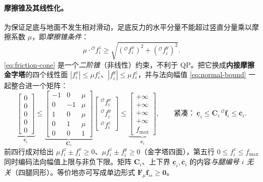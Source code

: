 \paragraph{ 摩擦锥及其线性化。}
为保证足底与地面不发生相对滑动，足底反力的水平分量不能超过竖直分量乘以摩擦系数 $\mu$，即\emph{摩擦锥条件}\cite{dicarlo2018cheetah,yu2021quadruped}：
\begin{equation}
  \mu\cdot{}^{\mathcal{O}}f_i^{z}\ge\sqrt{({}^{\mathcal{O}}f_i^{x})^2+({}^{\mathcal{O}}f_i^{y})^2}.
  \label{eq:friction-cone}
\end{equation}
\cref{eq:friction-cone} 是一个\emph{二阶锥}（非线性）约束，不利于 QP。把它换成\textbf{内接摩擦金字塔}的四个线性面 $|f_i^x|\le\mu f_i^z$、$|f_i^y|\le\mu f_i^z$，并与法向幅值 \cref{eq:normal-bound} 一起整合进一个矩阵\cite{dicarlo2018cheetah,yu2021quadruped}：
\begin{equation}
  \underbrace{\begin{bmatrix} 0 \\ 0 \\ 0 \\ 0 \\ 0 \end{bmatrix}}_{\underline{\mathbf{c}}_i}
  \le
  \underbrace{\begin{bmatrix} -1 & 0 & \mu \\ 0 & -1 & \mu \\ 1 & 0 & \mu \\ 0 & 1 & \mu \\ 0 & 0 & 1 \end{bmatrix}}_{\mathbf{C}_i}
  \begin{bmatrix} {}^{\mathcal{O}}f_i^{x} \\ {}^{\mathcal{O}}f_i^{y} \\ {}^{\mathcal{O}}f_i^{z} \end{bmatrix}
  \le
  \underbrace{\begin{bmatrix} +\infty \\ +\infty \\ +\infty \\ +\infty \\ f_{\max} \end{bmatrix}}_{\overline{\mathbf{c}}_i},
  \qquad\text{紧凑：}\ \underline{\mathbf{c}}_i\le\mathbf{C}_i\,{}^{\mathcal{O}}\boldsymbol{f}_i\le\overline{\mathbf{c}}_i.
  \label{eq:friction-matrix}
\end{equation}
前四行成对给出 $\mu f_i^z\pm f_i^x\ge0$、$\mu f_i^z\pm f_i^y\ge0$（金字塔四面），第五行 $0\le f_i^z\le f_{\max}$ 同时编码法向幅值上限与非负下限。矩阵 $\mathbf{C}_i$、上下界 $\underline{\mathbf{c}}_i,\overline{\mathbf{c}}_i$ 的内容\emph{与腿编号 $i$ 无关}（四腿同形）。等价地亦可写成单边形式 $\mathbf{F}_\mu\mathbf{f}_{is}\ge\mathbf{0}$\cite{unitree2023quadruped}。

